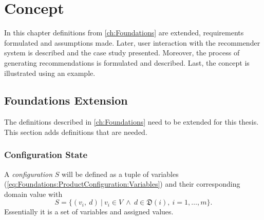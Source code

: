 \chapter{Concept}
\label{ch:Concept}

In this chapter definitions from \autoref{ch:Foundations} are extended, requirements formulated and assumptions made. Later, user interaction with the recommender system is described and the case study presented. Moreover, the process of generating recommendations is formulated and described. Last, the concept is illustrated using an example.

\section{Foundations Extension}
\label{sec:Concept:Requirements}

The definitions described in \autoref{ch:Foundations} need to be extended for this thesis. This section adds definitions that are needed.

\subsection{Configuration State}

A \emph{configuration} $S$ will be defined as a tuple of variables (\autoref{eq:Foundations:ProductConfiguration:Variables}) and their corresponding domain value with
\begin{equation} \label{eq:Foundations:ProductConfiguration:ConfigurationState}
    S = \{ (v_i,\ d) \ |\ v_i \in V \ \land \ d \in \mathfrak{D}(i),\ i=1,\dotsc,m \}.
\end{equation}
Essentially it is a set of variables and assigned values.

